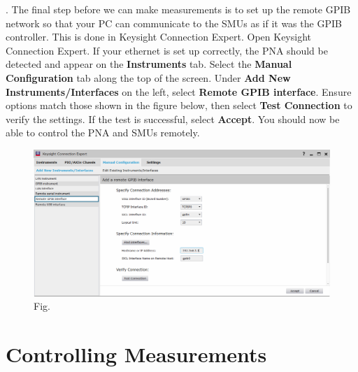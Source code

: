 \documentclass[]{article}
\begin{document}
\ex. The final step before we can make measurements is to set up the remote GPIB network so that your PC can communicate to the SMUs as if it was the GPIB controller. This is done in Keysight Connection Expert. Open Keysight Connection Expert. If your ethernet is set up correctly, the PNA should be detected and appear on the \textbf{Instruments} tab. Select the \textbf{Manual Configuration} tab along the top of the screen. Under \textbf{Add New Instruments/Interfaces} on the left, select \textbf{Remote GPIB interface}. Ensure options match those shown in the figure below, then select \textbf{Test Connection} to verify the settings. If the test is successful, select \textbf{Accept}. You should now be able to control the PNA and SMUs remotely.

\begin{figure}[H]
	\centering
	\includegraphics[width=\linewidth]{Figures/kce}
	\caption{Fig.}
	\label{fig:kce}
\end{figure}

\section{Controlling Measurements}
\end{document}

